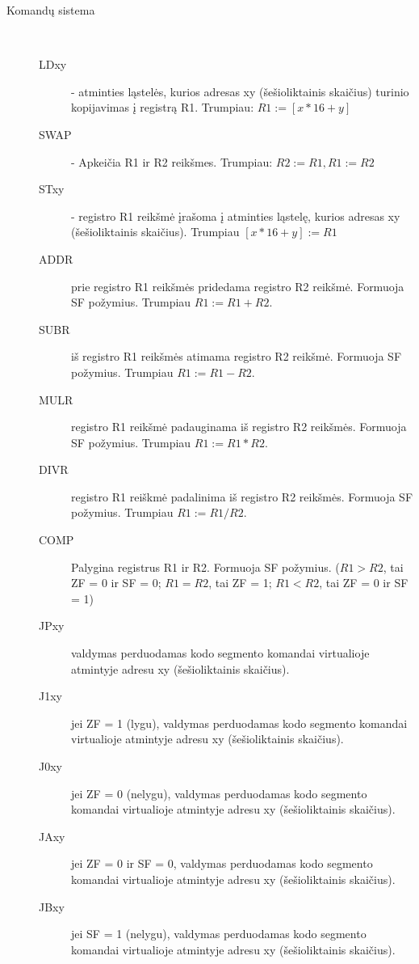 \begin{description}
    \item[Komandų sistema] \ 
    \begin{description}
        \item[LDxy] - atminties ląstelės, kurios adresas xy (šešioliktainis skaičius) turinio kopijavimas į registrą R1. Trumpiau: $R1:= [x*16 + y]$
        \item[SWAP] - Apkeičia R1 ir R2 reikšmes. Trumpiau: $R2:= R1, R1:= R2$
        
        \item[STxy] - registro R1 reikšmė įrašoma į atminties ląstelę, kurios adresas xy (šešioliktainis skaičius). Trumpiau $[x*16 + y]:= R1$
        
        \item[ADDR] prie registro R1 reikšmės pridedama registro R2 reikšmė. Formuoja SF požymius. Trumpiau $R1:= R1 + R2$.
        
        \item[SUBR] iš registro R1 reikšmės atimama registro R2 reikšmė. Formuoja SF požymius. Trumpiau $R1:= R1 - R2$.

        \item[MULR] registro R1 reikšmė padauginama iš registro R2 reikšmės. Formuoja SF požymius. Trumpiau $R1:= R1 * R2$.

        \item[DIVR] registro R1 reiškmė padalinima iš registro R2 reikšmės. Formuoja SF požymius. Trumpiau $R1:= R1 / R2$.

        \item[COMP] Palygina registrus R1 ir R2. Formuoja SF požymius. ($R1 > R2$, tai ZF = 0 ir SF = 0; $R1 = R2$, tai ZF = 1; $R1 < R2$, tai ZF = 0 ir SF = 1)

        \item[JPxy] valdymas perduodamas kodo segmento komandai virtualioje atmintyje adresu xy (šešioliktainis skaičius).

        \item[J1xy] jei ZF = 1 (lygu), valdymas perduodamas kodo segmento komandai virtualioje atmintyje adresu xy (šešioliktainis skaičius). 
        \item[J0xy] jei ZF = 0 (nelygu), valdymas perduodamas kodo segmento komandai virtualioje atmintyje adresu xy (šešioliktainis skaičius).

        \item[JAxy] jei ZF = 0 ir SF = 0, valdymas perduodamas kodo segmento komandai virtualioje atmintyje adresu xy (šešioliktainis skaičius). 
        \item[JBxy] jei SF = 1 (nelygu), valdymas perduodamas kodo segmento komandai virtualioje atmintyje adresu xy (šešioliktainis skaičius).


\end{description}
\end{description}
